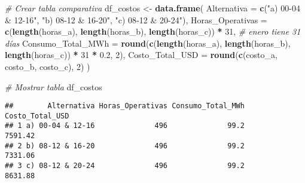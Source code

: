 \documentclass[
]{article}
\newenvironment{Shaded}{\begin{snugshade}}{\end{snugshade}}
\newcommand{\AttributeTok}[1]{\textcolor[rgb]{0.13,0.29,0.53}{#1}}
\newcommand{\CommentTok}[1]{\textcolor[rgb]{0.56,0.35,0.01}{\textit{#1}}}
\newcommand{\DecValTok}[1]{\textcolor[rgb]{0.00,0.00,0.81}{#1}}
\newcommand{\FloatTok}[1]{\textcolor[rgb]{0.00,0.00,0.81}{#1}}
\newcommand{\FunctionTok}[1]{\textcolor[rgb]{0.13,0.29,0.53}{\textbf{#1}}}
\newcommand{\NormalTok}[1]{#1}
\newcommand{\OtherTok}[1]{\textcolor[rgb]{0.56,0.35,0.01}{#1}}
\newcommand{\SpecialCharTok}[1]{\textcolor[rgb]{0.81,0.36,0.00}{\textbf{#1}}}
\newcommand{\StringTok}[1]{\textcolor[rgb]{0.31,0.60,0.02}{#1}}
\begin{document}
\begin{Shaded}
\begin{Highlighting}[]
\CommentTok{\# Crear tabla comparativa}
\NormalTok{df\_costos }\OtherTok{\textless{}{-}} \FunctionTok{data.frame}\NormalTok{(}
  \AttributeTok{Alternativa =} \FunctionTok{c}\NormalTok{(}\StringTok{"a) 00{-}04 \& 12{-}16"}\NormalTok{, }\StringTok{"b) 08{-}12 \& 16{-}20"}\NormalTok{, }\StringTok{"c) 08{-}12 \& 20{-}24"}\NormalTok{),}
  \AttributeTok{Horas\_Operativas =} \FunctionTok{c}\NormalTok{(}\FunctionTok{length}\NormalTok{(horas\_a), }\FunctionTok{length}\NormalTok{(horas\_b), }\FunctionTok{length}\NormalTok{(horas\_c)) }\SpecialCharTok{*} \DecValTok{31}\NormalTok{,  }\CommentTok{\# enero tiene 31 días}
  \AttributeTok{Consumo\_Total\_MWh =} \FunctionTok{round}\NormalTok{(}\FunctionTok{c}\NormalTok{(}\FunctionTok{length}\NormalTok{(horas\_a), }\FunctionTok{length}\NormalTok{(horas\_b), }\FunctionTok{length}\NormalTok{(horas\_c)) }\SpecialCharTok{*} \DecValTok{31} \SpecialCharTok{*} \FloatTok{0.2}\NormalTok{, }\DecValTok{2}\NormalTok{),}
  \AttributeTok{Costo\_Total\_USD =} \FunctionTok{round}\NormalTok{(}\FunctionTok{c}\NormalTok{(costo\_a, costo\_b, costo\_c), }\DecValTok{2}\NormalTok{)}
\NormalTok{)}

\CommentTok{\# Mostrar tabla}
\NormalTok{df\_costos}
\end{Highlighting}
\end{Shaded}

\begin{verbatim}
##        Alternativa Horas_Operativas Consumo_Total_MWh Costo_Total_USD
## 1 a) 00-04 & 12-16              496              99.2         7591.42
## 2 b) 08-12 & 16-20              496              99.2         7331.06
## 3 c) 08-12 & 20-24              496              99.2         8631.88
\end{verbatim}

\begin{Shaded}
\end{Shaded}
\end{document}
